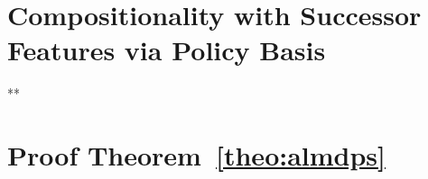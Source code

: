 \documentclass[12pt, a4paper,twoside]{tesi_upf}
\begin{document}
\chapter{Compositionality with Successor Features via Policy Basis}

% 




**\appendix
\chapter{Proof Theorem~\ref{theo:almdps}}


\backmatter 
\printindex
% 

\end{document}
